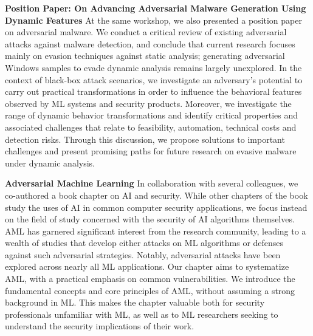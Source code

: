 \begin{myleftbar}
\end{myleftbar}

\textbf{Position Paper: On Advancing Adversarial Malware Generation Using Dynamic Features}
At the same workshop, we also presented a position paper on adversarial malware.
We conduct a critical review of existing adversarial attacks against malware detection, and conclude that current research focuses mainly on evasion techniques against static analysis; generating adversarial Windows samples to evade dynamic analysis remains largely unexplored.
In the context of black-box attack scenarios, we investigate an adversary's potential to carry out practical transformations in order to influence the behavioral features observed by ML systems and security products.
Moreover, we investigate the range of dynamic behavior transformations and identify critical properties and associated challenges that relate to feasibility, automation, technical costs and detection risks.
Through this discussion, we propose solutions to important challenges and present promising paths for future research on evasive malware under dynamic analysis.

\begin{myleftbar}
\end{myleftbar}

\textbf{Adversarial Machine Learning}
In collaboration with several colleagues, we co-authored a book chapter on \gls{AI} and security.
While other chapters of the book study the uses of AI in common computer security applications, we focus instead on the field of study concerned with the security of AI algorithms themselves.
\gls{AML} has garnered significant interest from the research community, leading to a wealth of studies that develop either attacks on ML algorithms or defenses against such adversarial strategies.
Notably, adversarial attacks have been explored across nearly all \gls{ML} applications.
Our chapter aims to systematize \gls{AML}, with a practical emphasis on common vulnerabilities.
We introduce the fundamental concepts and core principles of \gls{AML}, without assuming a strong background in \gls{ML}.
This makes the chapter valuable both for security professionals unfamiliar with \gls{ML}, as well as to \gls{ML} researchers seeking to understand the security implications of their work. 

\begin{myleftbar}
\end{myleftbar}

